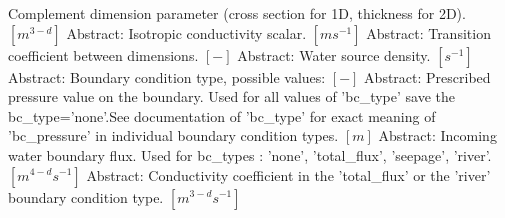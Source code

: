 \begin{RecordType}
			{\textrangle}
			{} %
			{{{Complement dimension parameter (cross section for 1D, thickness for 2D). }{$[m^{3-d}]$}}}
		\KeyItem
			{}
			{{Abstract}{: }}
			{\textrangle}
			{} %
			{{{Isotropic conductivity scalar. }{$[ms^{-1}]$}}}
		\KeyItem
			{}
			{{Abstract}{: }}
			{\textrangle}
			{} %
			{{{Transition coefficient between dimensions. }{$[-]$}}}
		\KeyItem
			{}
			{{Abstract}{: }}
			{\textrangle}
			{} %
			{{{Water source density. }{$[s^{-1}]$}}}
		\KeyItem
			{}
			{{Abstract}{: }}
			{\textrangle}
			{} %
			{{{Boundary condition type, possible values: }{$[-]$}}}
		\KeyItem
			{}
			{{Abstract}{: }}
			{\textrangle}
			{} %
			{{{Prescribed pressure value on the boundary. Used for all values of 'bc{\_}type' save the bc{\_}type='none'.See documentation of 'bc{\_}type' for exact meaning of 'bc{\_}pressure' in individual boundary condition types. }{$[m]$}}}
		\KeyItem
			{}
			{{Abstract}{: }}
			{\textrangle}
			{} %
			{{{Incoming water boundary flux. Used for bc{\_}types : 'none', 'total{\_}flux', 'seepage', 'river'. }{$[m^{4-d}s^{-1}]$}}}
		\KeyItem
			{}
			{{Abstract}{: }}
			{\textrangle}
			{} %
			{{{Conductivity coefficient in the 'total{\_}flux' or the 'river' boundary condition type. }{$[m^{3-d}s^{-1}]$}}}
		\KeyItem
			{}

\end{RecordType}
